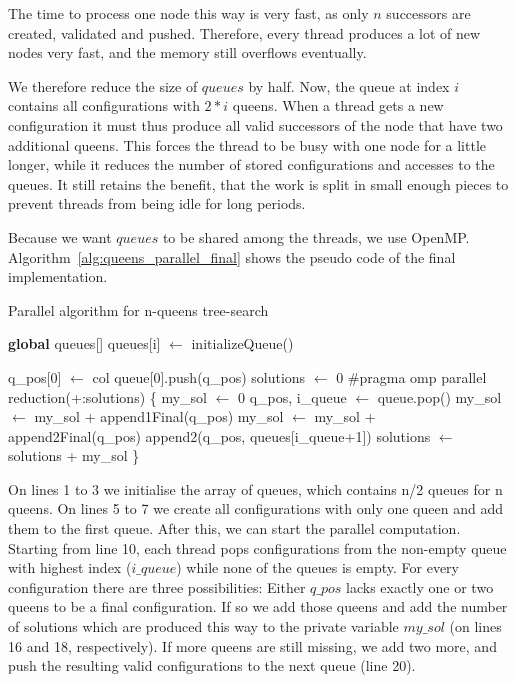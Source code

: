 The time to process one node this way is very fast, as only $n$ successors are created, validated and pushed.
Therefore, every thread produces a lot of new nodes very fast, and the memory still overflows eventually.

We therefore reduce the size of $queues$ by half.
Now, the queue at index $i$ contains all configurations with $2*i$ queens.
When a thread gets a new configuration it must thus produce all valid successors of the node that have two additional queens.
This forces the thread to be busy with one node for a little longer, while it reduces the number of stored configurations and accesses to the queues.
It still retains the benefit, that the work is split in small enough pieces to prevent threads from being idle for long periods.

Because we want $queues$ to be shared among the threads, we use OpenMP.
Algorithm~\ref{alg:queens_parallel_final} shows the pseudo code of the final implementation.

\begin{algorithm}[H]
\caption{Parallel algorithm for n-queens tree-search}
\label{alg:queens_parallel_final}
\begin{algorithmic}[1]
    \State \textbf{global} queues[]
        \State queues[i] $\gets$ initializeQueue() 
    \EndFor
    \State
   
        \State q\_pos[0] $\gets$ col
        \State queue[0].push(q\_pos)
    \EndFor
    \State
    \State solutions $\gets$ 0
    \State \#pragma omp parallel reduction(+:solutions)
    \State\{
    \State my\_sol $\gets$ 0
        \State q\_pos, i\_queue $\gets$ queue.pop()
            \State my\_sol $\gets$ my\_sol + append1Final(q\_pos)
            \State my\_sol $\gets$ my\_sol + append2Final(q\_pos)
        \Else
            \State append2(q\_pos, queues[i\_queue+1])
        \EndIf
    \EndWhile
    \State solutions $\gets$ solutions + my\_sol
    \State\}
    
    \State{}
    \EndFunction
\end{algorithmic}
\end{algorithm}


On lines 1 to 3 we initialise the array of queues, which contains n/2 queues for n queens.
On lines 5 to 7 we create all configurations with only one queen and add them to the first queue.
After this, we can start the parallel computation.
Starting from line 10, each thread pops configurations from the non-empty queue with highest index ($i\_queue$) while none of the queues is empty.
For every configuration there are three possibilities:
Either $q\_pos$ lacks exactly one or two queens to be a final configuration.
If so we add those queens and add the number of solutions which are produced this way to the private variable $my\_sol$ (on lines 16 and 18, respectively).
If more queens are still missing, we add two more, and push the resulting valid configurations to the next queue (line 20).

